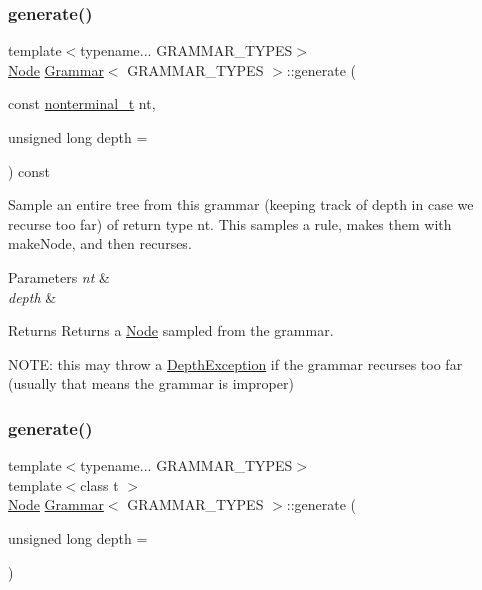 \mbox{\label{class_grammar_af5dee7ec88bdd66edd023b3c935d2765}} 
\subsubsection{\texorpdfstring{generate()}{generate()}\hspace{0.1cm}{\footnotesize\ttfamily [1/2]}}
{\footnotesize\ttfamily template$<$typename... G\+R\+A\+M\+M\+A\+R\+\_\+\+T\+Y\+P\+ES$>$ \\
\hyperlink{class_node}{Node} \hyperlink{class_grammar}{Grammar}$<$ G\+R\+A\+M\+M\+A\+R\+\_\+\+T\+Y\+P\+ES $>$\+::generate (\begin{DoxyParamCaption}\item[{const \hyperlink{_nonterminal_8h_a5c1f658dc7560600a16d22408bd716ca}{nonterminal\+\_\+t}}]{nt,  }\item[{unsigned long}]{depth = {} }\end{DoxyParamCaption}) const\hspace{0.3cm}{\ttfamily [inline]}}

Sample an entire tree from this grammar (keeping track of depth in case we recurse too far) of return type nt. This samples a rule, makes them with make\+Node, and then recurses. 
\begin{DoxyParams}{Parameters}
{\em nt} & \\
\hline
{\em depth} & \\
\hline
\end{DoxyParams}
\begin{DoxyReturn}{Returns}
Returns a \hyperlink{class_node}{Node} sampled from the grammar.
\end{DoxyReturn}
N\+O\+TE\+: this may throw a \hyperlink{class_grammar_1_1_depth_exception}{Depth\+Exception} if the grammar recurses too far (usually that means the grammar is improper)\mbox{\label{class_grammar_a01bf556e22bfdd5ec87868869fd9330f}} 
\subsubsection{\texorpdfstring{generate()}{generate()}\hspace{0.1cm}{\footnotesize\ttfamily [2/2]}}
{\footnotesize\ttfamily template$<$typename... G\+R\+A\+M\+M\+A\+R\+\_\+\+T\+Y\+P\+ES$>$ \\
template$<$class t $>$ \\
\hyperlink{class_node}{Node} \hyperlink{class_grammar}{Grammar}$<$ G\+R\+A\+M\+M\+A\+R\+\_\+\+T\+Y\+P\+ES $>$\+::generate (\begin{DoxyParamCaption}\item[{unsigned long}]{depth = {} }\end{DoxyParamCaption})\hspace{0.3cm}{\ttfamily [inline]}}

